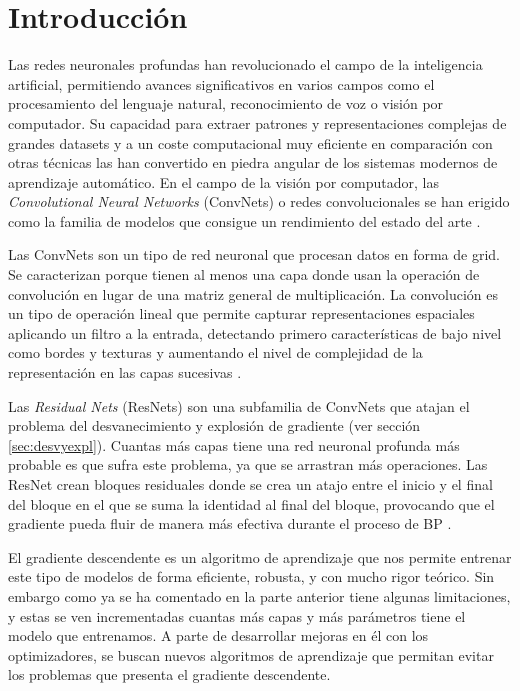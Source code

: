 \section{Introducción}

Las redes neuronales profundas han revolucionado el campo de la inteligencia artificial, permitiendo avances significativos en varios campos como el procesamiento del lenguaje natural, reconocimiento de voz o visión por computador. Su capacidad para extraer patrones y representaciones complejas de grandes datasets y a un coste computacional muy eficiente en comparación con otras técnicas las han convertido en piedra angular de los sistemas modernos de aprendizaje automático. En el campo de la visión por computador, las \textit{Convolutional Neural Networks} (ConvNets) o redes convolucionales se han erigido como la familia de modelos que consigue un rendimiento del estado del arte \cite{GoodFellowBook}.

Las ConvNets son un tipo de red neuronal que procesan datos en forma de grid. Se caracterizan porque tienen al menos una capa donde usan la operación de convolución en lugar de una matriz general de multiplicación. La convolución es un tipo de operación lineal que permite capturar representaciones espaciales aplicando un filtro a la entrada, detectando primero características de bajo nivel como bordes y texturas y aumentando el nivel de complejidad de la representación en las capas sucesivas \cite{GoodFellowBook}.

Las \textit{Residual Nets} (ResNets) son una subfamilia de ConvNets que atajan el problema del desvanecimiento y explosión de gradiente (ver sección \ref{sec:desvyexpl}). Cuantas más capas tiene una red neuronal profunda más probable es que sufra este problema, ya que se arrastran más operaciones. Las ResNet crean bloques residuales donde se crea un atajo entre el inicio y el final del bloque en el que se suma la identidad al final del bloque, provocando que el gradiente pueda fluir de manera más efectiva durante el proceso de BP \cite{ResNets}.

El gradiente descendente es un algoritmo de aprendizaje que nos permite entrenar este tipo de modelos de forma eficiente, robusta, y con mucho rigor teórico. Sin embargo como ya se ha comentado en la parte anterior tiene algunas limitaciones, y estas se ven incrementadas cuantas más capas y más parámetros tiene el modelo que entrenamos. A parte de desarrollar mejoras en él con los optimizadores, se buscan nuevos algoritmos de aprendizaje que permitan evitar los problemas que presenta el gradiente descendente.

